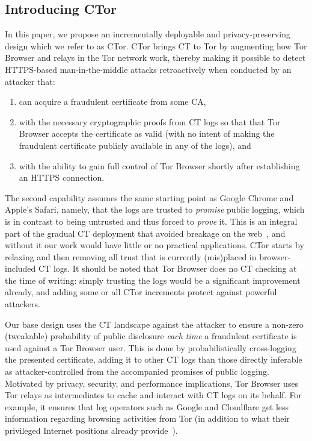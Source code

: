 \subsection{Introducing CTor}
In this paper, we propose an incrementally deployable and privacy-preserving
design which we refer to as CTor. CTor brings CT to Tor by augmenting how Tor
Browser and relays in the Tor network work, thereby making it possible to
detect HTTPS-based man-in-the-middle attacks retroactively when conducted by
an attacker that:
\begin{enumerate}
	\item can acquire a fraudulent certificate from some CA,
	\item with the necessary cryptographic proofs from CT logs so that that
		Tor Browser accepts the certificate as valid (with no intent of making
		the fraudulent certificate publicly available in any of the logs), and

	\item with the ability to gain full control of Tor Browser shortly after
		establishing an HTTPS connection.
\end{enumerate}

The second capability assumes the same starting point as Google Chrome and
Apple's Safari, namely, that the logs are trusted to \emph{promise} public
logging, which is in contrast to being untrusted and thus forced to \emph{prove}
it.  This is an integral part of the gradual CT deployment that avoided breakage
on the web~\cite{does-ct-break-the-web}, and without it our work would have
little or no practical applications.  CTor starts by relaxing and then removing
all trust that is currently (mis)placed in browser-included CT logs.  It should
be noted that Tor Browser does no CT checking at the time of writing:
	simply trusting the logs would be a significant improvement already, and
	adding some or all CTor increments protect against powerful attackers.

Our base design uses the CT landscape against the attacker to ensure a non-zero
(tweakable) probability of public disclosure \emph{each time} a fraudulent
certificate is used against a Tor Browser user.  This is done by
probabilistically cross-logging the presented certificate, adding it to
other CT logs than those directly inferable as attacker-controlled from the
accompanied promises of public logging.
Motivated by privacy, security, and performance implications, Tor Browser uses
Tor relays as intermediates to cache and interact with CT logs on its behalf.
For example, it ensures that log operators such as Google and Cloudflare get
less information regarding browsing activities from Tor (in addition to what
their privileged Internet positions already provide~\cite{1mtrack,TorDNS}).

